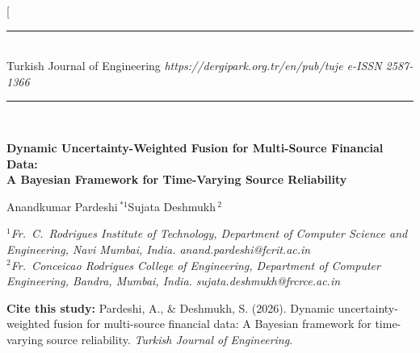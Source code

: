 \documentclass[10pt,a4paper,twocolumn]{article}
\begin{document}
\twocolumn[{%
\centering
\rule{\textwidth}{0.4pt}\\[2pt]
{\small Turkish Journal of Engineering \textbar{} \itshape https://dergipark.org.tr/en/pub/tuje \textbar{} \upshape e-ISSN 2587-1366}\\[1pt]
\rule{\textwidth}{0.4pt}\\[12pt]

{\LARGE\bfseries Dynamic Uncertainty-Weighted Fusion for Multi-Source Financial Data:\\[3pt]
A Bayesian Framework for Time-Varying Source Reliability\par}
\vspace{12pt}

{\large Anandkumar Pardeshi\,$^{*1}$\quad Sujata Deshmukh\,$^{2}$\par}
\vspace{8pt}

{\footnotesize\itshape
$^{1}$Fr.\ C.\ Rodrigues Institute of Technology, Department of Computer Science and Engineering, Navi Mumbai, India. anand.pardeshi@fcrit.ac.in\\[1pt]
$^{2}$Fr.\ Conceicao Rodrigues College of Engineering, Department of Computer Engineering, Bandra, Mumbai, India. sujata.deshmukh@frcrce.ac.in\par}
\vspace{8pt}

\begin{minipage}{0.95\textwidth}
\footnotesize
\textbf{Cite this study:} Pardeshi, A., \& Deshmukh, S. (2026). Dynamic uncertainty-weighted fusion for multi-source financial data: A Bayesian framework for time-varying source reliability. \textit{Turkish Journal of Engineering}.
\end{minipage}
\vspace{12pt}

}
\end{document}
